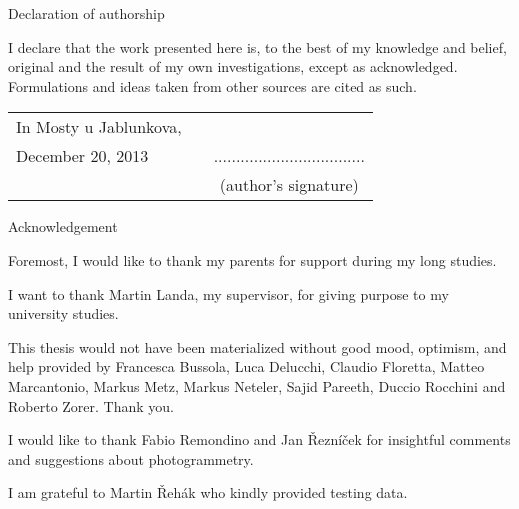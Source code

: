 \newcommand{\odsaditodzhora}{\hskip1pt\vfill}

\odsaditodzhora
\noindent Declaration of authorship

I declare that the work presented here is, to the best of my knowledge and
belief, original and the result of my own investigations, except as acknowledged.
Formulations and ideas taken from other sources are cited as such.

 \begin{flushleft}
\begin{tabular}{l m{6cm} c}
In Mosty u Jablunkova, && \\
December 20, 2013
& 
&
..................................
\\
&&
(author’s signature)
\end{tabular}

\end{flushleft}
\newpage


\odsaditodzhora
\noindent Acknowledgement

\noindent Foremost, I would like to thank my parents for support during my long studies. 

I want to thank Martin Landa, my supervisor, for giving purpose to my university studies. 

This thesis would not have  been materialized  without good mood, optimism, and help provided by
 Francesca Bussola,  Luca Delucchi, Claudio Floretta, Matteo Marcantonio, Markus Metz,
 Markus Neteler, Sajid Pareeth, Duccio Rocchini and Roberto Zorer. Thank you.
  
I would like to thank Fabio Remondino and Jan Řezníček for insightful comments and suggestions about photogrammetry. 
 
\noindent I am grateful to Martin Řehák who kindly provided testing data. 


\newpage
